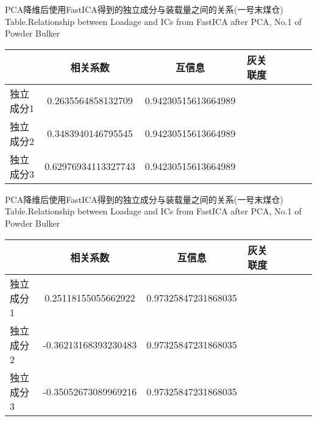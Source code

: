 \begin{table}[!htb]
\begin{center}
		{PCA降维后使用FastICA得到的独立成分与装载量之间的关系(一号末煤仓)}
			{Table.}{Relationship between Loadage and ICs from FastICA after PCA, No.1 of Powder Bulker}
\begin{tabular}{lccclccc}
\toprule
                		& 相关系数     					& 互信息      						&灰关联度 \\
\midrule
  独立成分1     	&  0.2635564858132709     		& 0.94230515613664989   		&    \\
  独立成分2     	&  0.3483940146795545			& 0.94230515613664989  		&    \\
  独立成分3     	&  0.62976934113327743			& 0.94230515613664989			&    \\
 \bottomrule
\end{tabular}
\end{center}
\end{table}

\begin{table}[!htb]
\begin{center}
		{PCA降维后使用FastICA得到的独立成分与装载量之间的关系(一号末煤仓)}
			{Table.}{Relationship between Loadage and ICs from FastICA after PCA, No.1 of Powder Bulker}
\begin{tabular}{lccclccc}
\toprule
                		& 相关系数     					& 互信息      						&灰关联度 \\
\midrule
  独立成分1     	&  0.25118155055662922     		& 0.97325847231868035   		&    \\
  独立成分2     	&  -0.36213168393230483		& 0.97325847231868035  		&    \\
  独立成分3     	&  -0.35052673089969216		& 0.97325847231868035			&    \\
 \bottomrule
\end{tabular}
\end{center}
\end{table}

